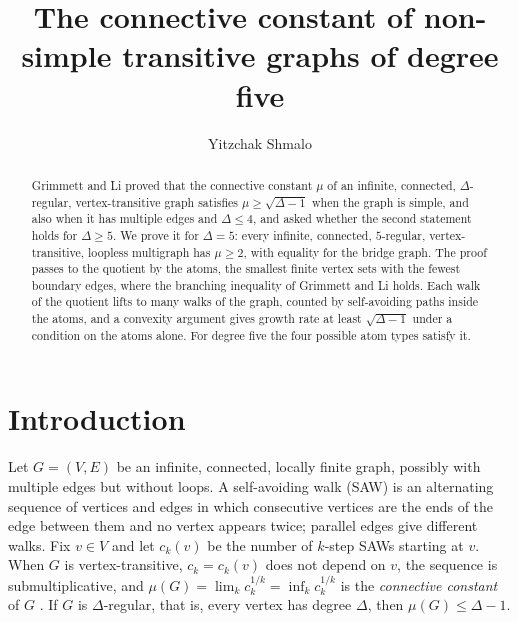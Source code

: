 \documentclass[11pt]{amsart}
\theoremstyle{remark}
\begin{document}
\title[Connective constant of non-simple transitive graphs of degree five]{The connective constant of
non-simple transitive graphs of degree five}
\author{Yitzchak Shmalo}
\address{Einstein Institute of Mathematics, The Hebrew University of Jerusalem, Jerusalem, Israel}

\begin{abstract}
Grimmett and Li proved that the connective constant $\mu$ of an infinite, connected, $\Delta$-regular,
vertex-transitive graph satisfies $\mu\ge\sqrt{\Delta-1}$ when the graph is simple, and also when it has multiple
edges and $\Delta\le4$, and asked whether the second statement holds for $\Delta\ge5$. We prove it for $\Delta=5$:
every infinite, connected, $5$-regular, vertex-transitive, loopless multigraph has $\mu\ge2$, with equality for the
bridge graph. The proof passes to the quotient by the atoms, the smallest finite vertex sets with the fewest boundary edges, where the branching
inequality of Grimmett and Li holds. Each walk of the quotient lifts to many walks of the graph, counted by
self-avoiding paths inside the atoms, and a convexity argument gives growth rate at least $\sqrt{\Delta-1}$ under
a condition on the atoms alone. For degree five the four possible atom types satisfy it.
\end{abstract}

\maketitle

\section{Introduction}\label{sec:intro}

Let $G=(V,E)$ be an infinite, connected, locally finite graph, possibly with multiple edges but without loops. A
self-avoiding walk (SAW) is an alternating sequence of vertices and edges in which consecutive vertices are the ends
of the edge between them and no vertex appears twice; parallel edges give different walks. Fix $v\in V$ and let
$c_k(v)$ be the number of $k$-step SAWs starting at $v$. When $G$ is vertex-transitive, $c_k=c_k(v)$ does not depend
on $v$, the sequence is submultiplicative, and $\mu(G)=\lim_kc_k^{1/k}=\inf_kc_k^{1/k}$ is the \emph{connective
constant} of $G$ \cite{HM54}. If $G$ is $\Delta$-regular, that is, every vertex has degree $\Delta$, then $\mu(G)\le\Delta-1$.
\end{document}
